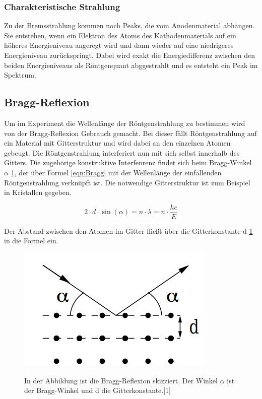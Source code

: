 \documentclass[titlepage = firstcover]{scrartcl}
\begin{document}
            \subsubsection*{Charakteristische Strahlung}
                Zu der Bremsstrahlung kommen noch Peaks, die vom Anodenmaterial abhängen. Sie entstehen, wenn ein Elektron des Atoms des Kathodenmaterials 
                auf ein höheres Energieniveau angeregt wird und dann wieder auf eine niedrigeres Energieniveau zurückspringt. Dabei wird exakt die 
                Energiedifferenz zwischen den beiden Energieniveaus als Röntgenquant abggestrahlt und es entsteht ein Peak im Spektrum.
                
        \subsection{Bragg-Reflexion}
        Um im Experiment die Wellenlänge der Röntgenstrahlung zu bestimmen wird von der Bragg-Reflexion Gebrauch gemacht. Bei dieser fällt Röntgenstrahlung
        auf ein Material mit Gitterstruktur und wird dabei an den einzelnen Atomen gebeugt. Die Röntgenstrahlung interferiert nun mit sich selbst innerhalb 
        des Gitters. Die zugehörige konstruktive Interfenrenz findet sich beim Bragg-Winkel $\alpha $ \ref{fig:SkizzeBragg}, der über Formel \ref{eqn:Bragg} 
        mit der Wellenlänge der einfallenden Röntgenstrahlung verknüpft ist. Die notwendige Gitterstruktur ist zum Beispiel in Kristallen gegeben.

        \begin{equation}
            2 \cdot d \cdot \sin(\alpha) = n \cdot \lambda = n \cdot \frac{hc}{E}
            \label{eqn:Bragg}
        \end{equation}

        \noindent
        Der Abstand zwischen den Atomen im Gitter fließt über die Gitterkonstante d \ref{fig:SkizzeBragg} in die Formel ein.
        
        \FloatBarrier
        \begin{figure}[h]
            \centering
            \caption{In der Abbildung ist die Bragg-Reflexion skizziert. Der Winkel $\alpha$ ist der Bragg-Winkel und d die Gitterkonstante.[1]}
            \includegraphics{Bragg.png}
            \label{fig:SkizzeBragg}
        \end{figure}
        \FloatBarrier
\end{document}
